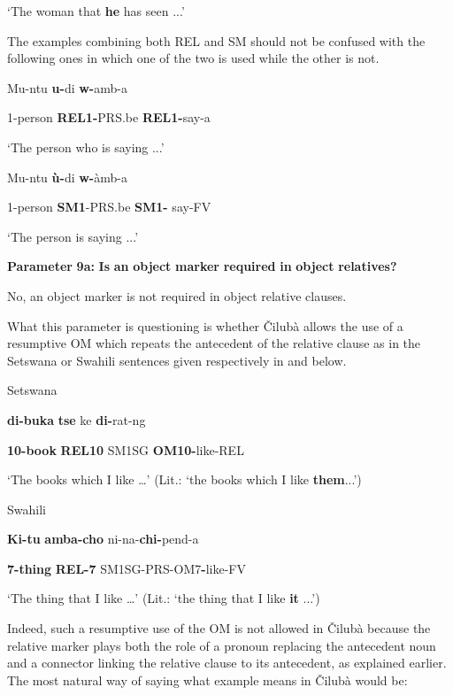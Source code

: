 \documentclass[output=paper]{langscibook}
\begin{document}
\glt ‘The woman that \textbf{he} has seen ...’

The examples combining both REL and SM should not be confused with the following ones in which one of the two is used while the other is not.

\ea%
    \label{ex:lukusa:64}
    \z

          Mu-ntu    \textbf{u{}-}di        \textbf{w-}amb-a  

    1-person  \textbf{REL1-}PRS.be  \textbf{REL1-}say-a

\glt ‘The person who is saying ...’

\ea%
    \label{ex:lukusa:65}
    \z

          Mu-ntu    \textbf{ù{}-}di        \textbf{w-}àmb-a  

    1-person  \textbf{SM1}{}-PRS.be  \textbf{SM1-}  say-FV

\glt ‘The person is saying ...’

\textbf{Parameter} \textbf{9a:} \textbf{Is} \textbf{an} \textbf{object} \textbf{marker} \textbf{required} \textbf{in} \textbf{object} \textbf{relatives?}

No, an object marker is not required in object relative clauses.

What this parameter is questioning is whether Čilubà allows the use of a resumptive OM which repeats the antecedent of the relative clause as in the Setswana or Swahili sentences given respectively in  and  below.

\ea%
    \label{ex:lukusa:66}
    \z

          Setswana

\textbf{di-buka}    \textbf{tse}    ke      \textbf{di-}rat-ng  

\textbf{10-book}    \textbf{REL10}  SM1SG  \textbf{OM10-}like-REL

\glt ‘The books which I like …’ (Lit.: ‘the books which I like \textbf{them}...’)

\ea%
    \label{ex:lukusa:67}
    \z

          Swahili

\textbf{Ki-tu}      \textbf{amba-cho}    ni-na-\textbf{chi-}pend-a 

\textbf{7-thing}    \textbf{REL-7}        SM1SG-PRS-OM7\textbf{{}-}like-FV

\glt ‘The thing that I like …’ (Lit.: ‘the thing that I like \textbf{it} ...’)

Indeed, such a resumptive use of the OM is not allowed in Čilubà because the relative marker plays both the role of a pronoun replacing the antecedent noun and a connector linking the relative clause to its antecedent, as explained earlier. The most natural way of saying what example  means in Čilubà would be:
\end{document}

